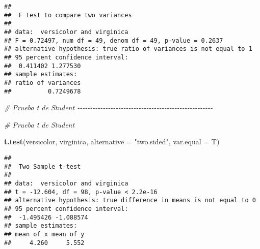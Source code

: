 \documentclass[
]{article}
\newenvironment{Shaded}{\begin{snugshade}}{\end{snugshade}}
\newcommand{\AttributeTok}[1]{\textcolor[rgb]{0.13,0.29,0.53}{#1}}
\newcommand{\CommentTok}[1]{\textcolor[rgb]{0.56,0.35,0.01}{\textit{#1}}}
\newcommand{\FunctionTok}[1]{\textcolor[rgb]{0.13,0.29,0.53}{\textbf{#1}}}
\newcommand{\NormalTok}[1]{#1}
\newcommand{\StringTok}[1]{\textcolor[rgb]{0.31,0.60,0.02}{#1}}
\begin{document}
\begin{verbatim}
## 
##  F test to compare two variances
## 
## data:  versicolor and virginica
## F = 0.72497, num df = 49, denom df = 49, p-value = 0.2637
## alternative hypothesis: true ratio of variances is not equal to 1
## 95 percent confidence interval:
##  0.411402 1.277530
## sample estimates:
## ratio of variances 
##          0.7249678
\end{verbatim}

\begin{Shaded}
\begin{Highlighting}[]
\CommentTok{\# Prueba t de Student {-}{-}{-}{-}{-}{-}{-}{-}{-}{-}{-}{-}{-}{-}{-}{-}{-}{-}{-}{-}{-}{-}{-}{-}{-}{-}{-}{-}{-}{-}{-}{-}{-}{-}{-}{-}{-}{-}{-}{-}{-}{-}{-}{-}{-}{-}{-}{-}{-}{-}{-}{-}{-}}

\CommentTok{\# Prueba t de Student}

\FunctionTok{t.test}\NormalTok{(versicolor, virginica,}
       \AttributeTok{alternative =} \StringTok{"two.sided"}\NormalTok{,}
       \AttributeTok{var.equal =}\NormalTok{ T)}
\end{Highlighting}
\end{Shaded}

\begin{verbatim}
## 
##  Two Sample t-test
## 
## data:  versicolor and virginica
## t = -12.604, df = 98, p-value < 2.2e-16
## alternative hypothesis: true difference in means is not equal to 0
## 95 percent confidence interval:
##  -1.495426 -1.088574
## sample estimates:
## mean of x mean of y 
##     4.260     5.552
\end{verbatim}
\end{document}
